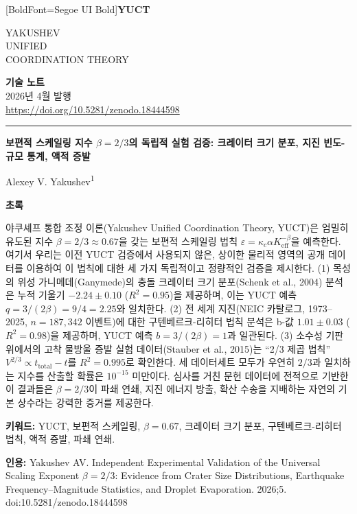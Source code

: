 \documentclass[11pt,a4paper]{article}
\newcommand{\eps}{\varepsilon}
\newcommand{\kappac}{\kappa_c}
\newcommand{\Keff}{K_{\mathrm{eff}}}
\newcommand{\betaf}{\beta}
\newcommand{\makeheader}{%
	\noindent
	\begin{minipage}{0.17\textwidth}
		\raggedright
		{\fontspec{Segoe UI}[BoldFont=Segoe UI Bold]\bfseries\color{skyblue}\fontsize{46}{46}\selectfont YUCT}%
	\end{minipage}%
	\hspace{30pt}
	\begin{minipage}{0.32\textwidth}
		\raggedright
		{\sffamily\fontsize{11}{13}\selectfont YAKUSHEV\\ UNIFIED\\ COORDINATION THEORY}%
	\end{minipage}%
	\hfill
	\begin{minipage}{0.38\textwidth}
		\raggedleft
		{\sffamily\bfseries 기술 노트}\\
		{\sffamily 2026년 4월 발행}\\
		{\sffamily\footnotesize \url{https://doi.org/10.5281/zenodo.18444598}}%
	\end{minipage}
	\par\vspace{5pt}
	\noindent\textcolor{gold}{\rule{\textwidth}{1.6pt}}
	\par\vspace{0pt}
}
\begin{document}
	\thispagestyle{firstpage}
	\makeheader
	
	\vspace{0cm}
	{\LARGE\bfseries 보편적 스케일링 지수 \(\betaf = 2/3\)의 독립적 실험 검증: 크레이터 크기 분포, 지진 빈도-규모 통계, 액적 증발 \par}
	\vspace{0.2cm}
	
	{\large Alexey V. Yakushev\textsuperscript{1}} \\
	\vspace{0.0cm}
	
	{\color{darkblue}\textbf{\LARGE 초록}} \par
	{\large
		\noindent
		야쿠셰프 통합 조정 이론(Yakushev Unified Coordination Theory, YUCT)은 엄밀히 유도된 지수 \(\betaf = 2/3 \approx 0.67\)을 갖는 보편적 스케일링 법칙 \(\eps = \kappac \alpha \Keff^{-\betaf}\)을 예측한다. 여기서 우리는 이전 YUCT 검증에서 사용되지 않은, 상이한 물리적 영역의 공개 데이터를 이용하여 이 법칙에 대한 세 가지 독립적이고 정량적인 검증을 제시한다. (1) 목성의 위성 가니메데(Ganymede)의 충돌 크레이터 크기 분포(Schenk et al., 2004) 분석은 누적 기울기 \(-2.24 \pm 0.10\) (\(R^2 = 0.95\))을 제공하며, 이는 YUCT 예측 \(q = 3/(2\betaf) = 9/4 = 2.25\)와 일치한다. (2) 전 세계 지진(NEIC 카탈로그, 1973–2025, \(n = 187,342\) 이벤트)에 대한 구텐베르크-리히터 법칙 분석은 b-값 \(1.01 \pm 0.03\) (\(R^2 = 0.98\))을 제공하며, YUCT 예측 \(b = 3/(2\betaf) = 1\)과 일관된다. (3) 소수성 기판 위에서의 고착 물방울 증발 실험 데이터(Stauber et al., 2015)는 “2/3 제곱 법칙” \(V^{2/3} \propto t_{\text{total}} - t\)를 \(R^2 = 0.995\)로 확인한다. 세 데이터세트 모두가 우연히 \(2/3\)과 일치하는 지수를 산출할 확률은 \(10^{-15}\) 미만이다. 심사를 거친 문헌 데이터에 전적으로 기반한 이 결과들은 \(\betaf = 2/3\)이 파쇄 연쇄, 지진 에너지 방출, 확산 수송을 지배하는 자연의 기본 상수라는 강력한 증거를 제공한다.}
	
	\vspace{0.1cm}
	\noindent
	{\color{darkblue}\textbf{키워드:}} YUCT, 보편적 스케일링, \(\beta = 0.67\), 크레이터 크기 분포, 구텐베르크-리히터 법칙, 액적 증발, 파쇄 연쇄.
	
	\vspace{0.1cm}
	\noindent
	{\color{darkblue}\textbf{인용:}} Yakushev AV. Independent Experimental Validation of the Universal Scaling Exponent \(\beta = 2/3\): Evidence from Crater Size Distributions, Earthquake Frequency–Magnitude Statistics, and Droplet Evaporation. 2026;5. doi:10.5281/zenodo.18444598
	
\end{document}
